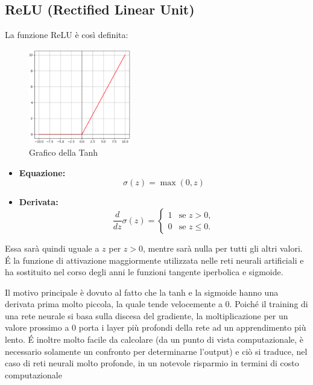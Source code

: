 \subsection{ReLU (Rectified Linear Unit)}
La funzione ReLU è così definita:
\begin{multicols}{2}
    {
        \begin{figure}[H]
            \centering
            \includegraphics[width=0.40\textwidth]{Immagini/Grafici/graficoRelu.png}
            \caption{Grafico della Tanh}
        \end{figure}
    }
    {
        \begin{itemize}
            \item \textbf{Equazione:}
            \begin{equation}
                \sigma(z) = \max(0, z)
            \end{equation}
                
            \item \textbf{Derivata:}
            \begin{equation}
                \frac{d}{dz}\sigma(z) = \begin{cases}
                    1 & \text{se } z > 0, \\
                    0 & \text{se } z \leq 0.
                \end{cases}
            \end{equation}
        \end{itemize}
        Essa sarà quindi uguale a $z$ per $z > 0$, mentre sarà 
        nulla per tutti gli altri valori.
        \'E la funzione di attivazione maggiormente utilizzata 
        nelle reti neurali artificiali e ha sostituito nel corso 
        degli anni le funzioni tangente iperbolica e sigmoide.
    }
\end{multicols}


Il motivo principale è dovuto al fatto che la tanh e la sigmoide 
hanno una derivata prima molto piccola, la
quale tende velocemente a 0.
Poiché il training di una rete neurale si basa sulla discesa del gradiente, la 
moltiplicazione per un valore prossimo a 0 porta i layer più profondi della rete ad un apprendimento
 più lento. \'E inoltre molto facile da calcolare (da un punto di vista computazionale, è necessario
 solamente un confronto per determinarne l’output) e ciò si traduce, nel caso di reti
 neurali molto profonde, in un notevole risparmio in termini di costo computazionale





